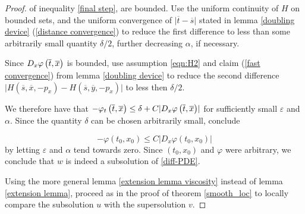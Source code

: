 \begin{theorem}
\begin{proof}
		  		of inequality \eqref{final step}, 
		  		are bounded. Use the uniform continuity of $ H $ on bounded sets, and the uniform convergence of $ \lvert \overline{t} - \overline{s} \rvert $ stated in lemma \ref{doubling device} (\ref{distance convergence}) to reduce the first difference to less than some arbitrarily small quantity $ \delta / 2 $, further decreasing $ \alpha $, if necessary.
		  		
		  		Since $ D_x \varphi\left(\overline{t}, \overline{x}\right) $ is bounded, use assumption \eqref{eqn:H2} and claim (\ref{fast convergence}) from lemma \ref{doubling device} to reduce the second difference $ \lvert H(\overline{s}, \overline{x}, -p_x) - H(\overline{s}, \overline{y}, -p_x) \rvert $ to less then $ \delta / 2 $.
		  		
		  		We therefore have that $ -\varphi_t\left(\overline{t}, \overline{x}\right) \leq \delta + C \lvert D_x \varphi\left(\overline{t}, \overline{x}\right) \rvert $ for sufficiently small $ \varepsilon $ and $ \alpha $. Since the quantity $ \delta $ can be chosen arbitrarily small, conclude 
		  		
		  		\begin{equation*}
		  			- \varphi(t_0, x_0) \leq C \lvert D_x \varphi(t_0, x_0) \rvert
		  		\end{equation*}
		  		by letting $ \varepsilon $ and $ \alpha $ tend towards zero. Since $ (t_0, x_0) $ and $ \varphi $ were arbitrary, we conclude that $ w $ is indeed a subsolution of \eqref{diff-PDE}.
		  		
		  		Using the more general lemma \ref{extension lemma viscosity} instead of lemma \ref{extension lemma}, proceed as in the proof of theorem \ref{smooth_loc} to locally compare the subsolution $ u $ with the supersolution $ v $.
		  	\end{proof}
		  \end{theorem}